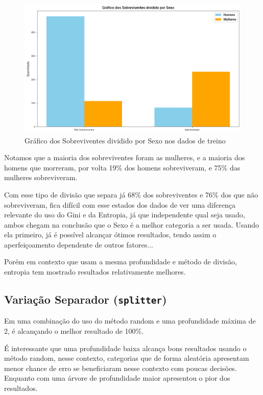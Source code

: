 \documentclass[a4paper,11pt]{article}
\begin{document}
\begin{figure}[h]
    \centering
    \includegraphics[width=1\textwidth]{output.png}
    \caption{Gráfico dos Sobreviventes dividido por Sexo nos dados de treino}
    \label{fig:nome_para_referenciar}
\end{figure}

Notamos que a maioria dos sobreviventes foram as mulheres, e a maioria dos homens que morreram, por volta 19\% dos homens sobreviveram, e 75\% das mulheres sobreviveram.

Com esse tipo de divisão que separa já 68\% dos sobreviventes e 76\% dos que não sobreviveram, fica difícil com esse estados dos dados de ver uma diferença relevante do uso do Gini e da Entropia, já que independente qual seja usado, ambos chegam na conclusão que o Sexo é a melhor categoria a ser usada. Usando ela primeiro, já é possível alcançar ótimos resultados, tendo assim o aperfeiçoamento dependente de outros fatores...

Porém em contexto que usam a mesma profundidade e método de divisão, entropia tem mostrado resultados relativamente melhores.

\subsection{Variação Separador (\texttt{splitter})}

Em uma combinação do uso do método random e uma profundidade máxima de 2, é alcançando o melhor resultado de 100\%.

É interessante que uma profundidade baixa alcança bons resultados usando o método random, nesse contexto, categorias que de forma aleatória apresentam menor chance de erro se beneficiaram nesse contexto com poucas decisões. Enquanto com uma árvore de profundidade maior apresentou o pior dos resultados.
\end{document}
